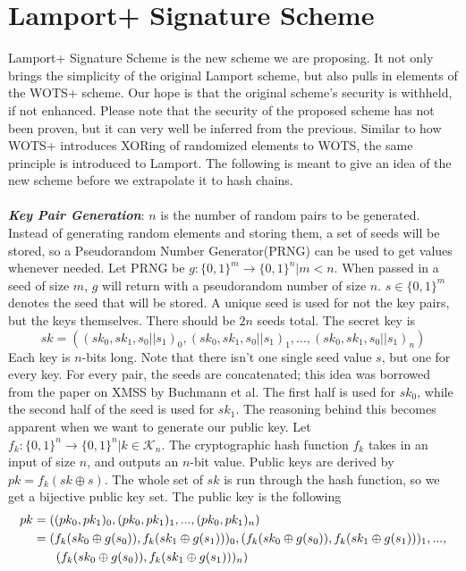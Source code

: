 \documentclass[]{scrartcl}
\makeatletter
\newcommand{\mathcenter}{\@fleqnfalse}
\makeatother
\begin{document}
\section*{Lamport+ Signature Scheme}
Lamport+ Signature Scheme is the new scheme we are proposing. It not only brings the simplicity of the original Lamport scheme, but also pulls in elements of the WOTS+ scheme. Our hope is that the original scheme's security is withheld, if not enhanced. Please note that the security of the proposed scheme has not been proven, but it can very well be inferred from the previous. Similar to how WOTS+ introduces XORing of randomized elements to WOTS, the same principle is introduced to Lamport. The following is meant to give an idea of the new scheme before we extrapolate it to hash chains.\\ \\
\textbf{\textit{Key Pair Generation}}: $n$ is the number of random pairs to be generated. Instead of generating random elements and storing them, a set of seeds will be stored, so a Pseudorandom Number Generator(PRNG) can be used to get values whenever needed. Let PRNG be $g : \{0,1\}^m \rightarrow \{0,1\}^n | m < n$. When passed in a seed of size $m$, $g$ will return with a pseudorandom number of size $n$. $s \in \{0,1\}^m$ denotes the seed that will be stored. A unique seed is used for not the key pairs, but the keys themselves. There should be $2n$ seeds total. The secret key is 
\mathcenter
\begin{equation}
sk = ((sk_0, sk_1, s_0||s_1)_0,(sk_0, sk_1, s_0||s_1)_1,...,(sk_0, sk_1, s_0||s_1)_n) 
\end{equation}
Each key is $n$-bits long. Note that there isn't one single seed value $s$, but one for every key. For every pair, the seeds are concatenated; this idea was borrowed from the paper on XMSS by Buchmann et al. The first half is used for $sk_0$, while the second half of the seed is used for $sk_1$. The reasoning behind this becomes apparent when we want to generate our public key. Let $f_k : \{0,1\}^n \rightarrow \{0,1\}^n | k \in \mathcal{K}_n$. The cryptographic hash function $f_k$ takes in an input of size $n$, and outputs an $n$-bit value. Public keys are derived by $pk = f_k(sk \oplus s)$. The whole set of $sk$ is run through the hash function, so we get a bijective public key set. The public key is the following 
\mathcenter
\begin{equation}
	\begin{split}
		pk & = ((pk_0, pk_1)_0,(pk_0, pk_1)_1,...,(pk_0, pk_1)_n) \\
		& = (f_k(sk_0 \oplus g(s_0)), f_k(sk_1 \oplus g(s_1)))_0,(f_k(sk_0 \oplus g(s_0)), f_k(sk_1 \oplus g(s_1)))_1,...,\\
		& \hspace{0.65cm}(f_k(sk_0 \oplus g(s_0)), f_k(sk_1 \oplus g(s_1)))_n) 
	\end{split}
\end{equation} \\
\end{document}

